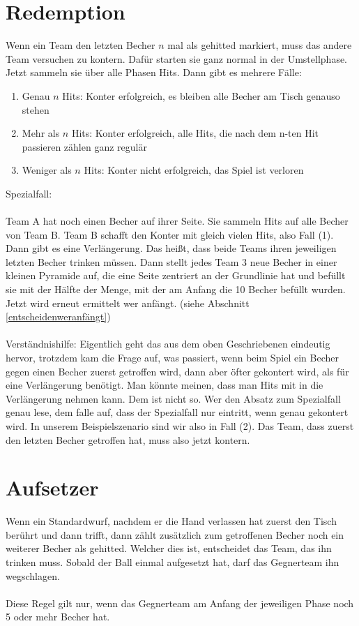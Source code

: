 \documentclass[a5paper, 12pt]{book}
\begin{document}
\section{Redemption}\label{redemption}
Wenn ein Team den letzten Becher $n$ mal als gehitted markiert, muss das andere Team versuchen zu kontern. Dafür starten sie ganz normal in der Umstellphase. Jetzt sammeln sie über alle Phasen Hits. Dann gibt es mehrere Fälle:
\begin{enumerate}[(1)]
    \item Genau $n$ Hits: Konter erfolgreich, es bleiben alle Becher am Tisch genauso stehen
    \item Mehr als $n$ Hits: Konter erfolgreich, alle Hits, die nach dem n-ten Hit passieren zählen ganz regulär
    \item Weniger als $n$ Hits: Konter nicht erfolgreich, das Spiel ist verloren
\end{enumerate}
Spezialfall:\\\\
Team A hat noch einen Becher auf ihrer Seite. Sie sammeln Hits auf alle Becher von Team B. Team B schafft den Konter mit gleich vielen Hits, also Fall (1).\\
Dann gibt es eine Verlängerung. Das heißt, dass beide Teams ihren jeweiligen letzten Becher trinken müssen. Dann stellt jedes Team 3 neue Becher in einer kleinen Pyramide auf, die eine Seite zentriert an der Grundlinie hat und befüllt sie mit der Hälfte der Menge, mit der am Anfang die 10 Becher befüllt wurden. Jetzt wird erneut ermittelt wer anfängt. (siehe Abschnitt \ref{entscheidenweranfängt})\\\\
Verständnishilfe: Eigentlich geht das aus dem oben Geschriebenen eindeutig hervor, trotzdem kam die Frage auf, was passiert, wenn beim Spiel ein Becher gegen einen Becher zuerst getroffen wird, dann aber öfter gekontert wird, als für eine Verlängerung benötigt. Man könnte meinen, dass man Hits mit in die Verlängerung nehmen kann. Dem ist nicht so. Wer den Absatz zum Spezialfall genau lese, dem falle auf, dass der Spezialfall nur eintritt, wenn genau gekontert wird. In unserem Beispielszenario sind wir also in Fall (2). Das Team, dass zuerst den letzten Becher getroffen hat, muss also jetzt kontern. 

\section{Aufsetzer}\label{aufsetzer}
Wenn ein Standardwurf, nachdem er die Hand verlassen hat zuerst den Tisch berührt und dann trifft, dann zählt zusätzlich zum getroffenen Becher noch ein weiterer Becher als gehitted. Welcher dies ist, entscheidet das Team, das ihn trinken muss. Sobald der Ball einmal aufgesetzt hat, darf das Gegnerteam ihn wegschlagen.\\\\
Diese Regel gilt nur, wenn das Gegnerteam am Anfang der jeweiligen Phase noch 5 oder mehr Becher hat.
\end{document}
